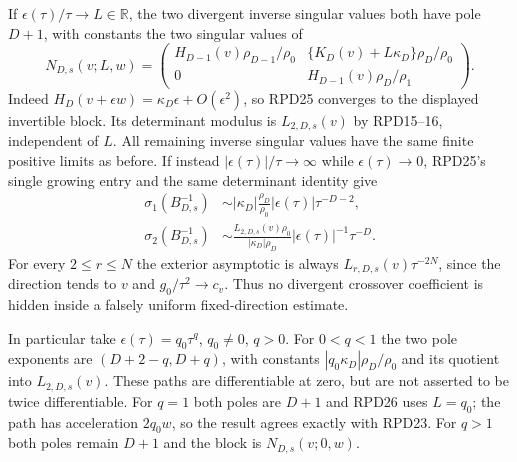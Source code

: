 \documentclass[11pt]{article}
\begin{document}
If $\epsilon(\tau)/\tau\to L\in\mathbb R$, the two divergent
inverse singular values both have pole $D+1$, with constants the
two singular values of
\[
 N_{D,s}(v;L,w)=\begin{pmatrix}
 H_{D-1}(v)\rho_{D-1}/\rho_0&
 \{K_D(v)+L\kappa_D\}\rho_D/\rho_0\\
 0&H_{D-1}(v)\rho_D/\rho_1
 \end{pmatrix}.\tag{RPD26}
\]
Indeed $H_D(v+\epsilon w)=\kappa_D\epsilon+O(\epsilon^2)$,
so RPD25 converges to the displayed invertible block.  Its
determinant modulus is $L_{2,D,s}(v)$ by RPD15--16, independent
of $L$.  All remaining inverse singular values have the same
finite positive limits as before.  If instead
$|\epsilon(\tau)|/\tau\to\infty$ while $\epsilon(\tau)\to0$,
RPD25's single growing entry and the same determinant identity give
\[
 \begin{aligned}
 \sigma_1(B_{D,s}^{-1})&\sim
     |\kappa_D|\frac{\rho_D}{\rho_0}
                   |\epsilon(\tau)|\tau^{-D-2},\\
 \sigma_2(B_{D,s}^{-1})&\sim
     \frac{L_{2,D,s}(v)\rho_0}{|\kappa_D|\rho_D}
                   |\epsilon(\tau)|^{-1}\tau^{-D}.
 \end{aligned}\tag{RPD27}
\]
For every $2\le r\le N$ the exterior asymptotic is always
$L_{r,D,s}(v)\tau^{-2N}$, since the direction tends to $v$ and
$g_0/\tau^2\to c_v$.  Thus no divergent crossover coefficient is
hidden inside a falsely uniform fixed-direction estimate.

In particular take $\epsilon(\tau)=q_0\tau^q$, $q_0\ne0$, $q>0$.
For $0<q<1$ the two pole exponents are
$(D+2-q,D+q)$, with constants
$|q_0\kappa_D|\rho_D/\rho_0$ and its quotient into
$L_{2,D,s}(v)$.  These paths are differentiable at zero, but are
not asserted to be twice differentiable.  For $q=1$ both poles are
$D+1$ and RPD26 uses $L=q_0$; the path has acceleration $2q_0w$,
so the result agrees exactly with RPD23.  For $q>1$ both poles
remain $D+1$ and the block is $N_{D,s}(v;0,w)$.
\end{document}
